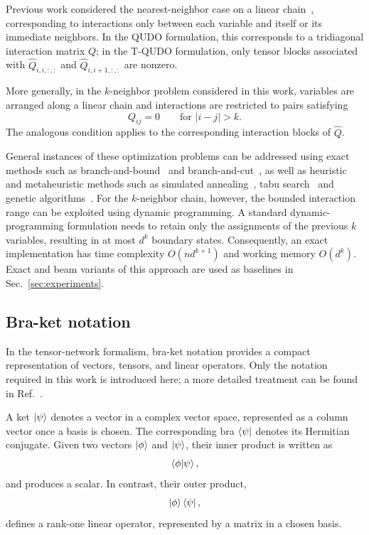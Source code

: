 \documentclass[%
 reprint,
 amsmath,amssymb,
 aps,
 pra,showkeys,
]{revtex4-2}
\begin{document}
Previous work considered the nearest-neighbor case on a linear
chain~\cite{QUBO_tridiaonal}, corresponding to interactions only between
each variable and itself or its immediate neighbors. In the QUDO
formulation, this corresponds to a tridiagonal interaction matrix $Q$;
in the T-QUDO formulation, only tensor blocks associated with
$\hat{Q}_{i,i,:,:}$ and $\hat{Q}_{i,i+1,:,:}$ are nonzero.

More generally, in the $k$-neighbor problem considered in this work,
variables are arranged along a linear chain and interactions are
restricted to pairs satisfying
\begin{equation}
Q_{ij}=0 \qquad \text{for } |i-j|>k.
\end{equation}
The analogous condition applies to the corresponding interaction blocks
of $\hat{Q}$.

General instances of these optimization problems can be addressed using
exact methods such as branch-and-bound~\cite{brach_and_bound} and
branch-and-cut~\cite{branch_cut}, as well as heuristic and
metaheuristic methods such as simulated
annealing~\cite{simmulated_annealing_kirk}, tabu
search~\cite{tabu_search_glover} and genetic
algorithms~\cite{genetic_holland}. For the $k$-neighbor chain, however,
the bounded interaction range can be exploited using dynamic programming. A standard dynamic-programming
formulation needs to retain only the assignments of the previous $k$
variables, resulting in at most $d^k$ boundary states. Consequently, an
exact implementation has time complexity $O(nd^{k+1})$ and working
memory $O(d^k)$. Exact and beam variants of this approach are used
as baselines in Sec.~\ref{sec:experiments}.

\subsection{Bra-ket notation}\label{ssec:braket_notation}
In the tensor-network formalism, bra-ket notation provides a compact
representation of vectors, tensors, and linear operators. Only the
notation required in this work is introduced here; a more detailed
treatment can be found in Ref.~\cite{cohen}.

A ket $\ket{\psi}$ denotes a vector in a complex vector space, represented
as a column vector once a basis is chosen. The corresponding bra
$\bra{\psi}$ denotes its Hermitian conjugate. Given two vectors
$\ket{\phi}$ and $\ket{\psi}$, their inner product is written as
\begin{equation}
    \braket{\phi|\psi},
\end{equation}
and produces a scalar. In contrast, their outer product,
\begin{equation}
    \ket{\phi}\bra{\psi},
\end{equation}
defines a rank-one linear operator, represented by a matrix in a chosen
basis.
\end{document}
